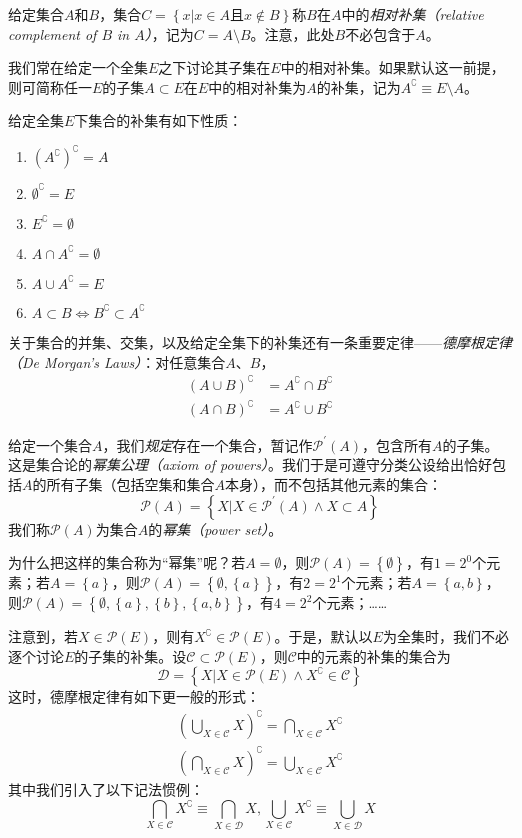 \documentclass[../main.tex]{subfiles}
\begin{document}
给定集合$A$和$B$，集合$C=\left\{x|x\in A\text{且}x\notin B\right\}$称$B$在$A$中的\emph{相对补集（relative complement of $B$ in $A$）}，记为$C=A\setminus B$。注意，此处$B$不必包含于$A$。

我们常在给定一个全集$E$之下讨论其子集在$E$中的相对补集。如果默认这一前提，则可简称任一$E$的子集$A\subset E$在$E$中的相对补集为$A$的补集，记为$A^\complement\equiv E\setminus A$。

给定全集$E$下集合的补集有如下性质：
\begin{enumerate}
\item $\left(A^\complement\right)^\complement=A$
\item $\emptyset^\complement=E$
\item $E^\complement=\emptyset$
\item $A\cap A^\complement=\emptyset$
\item $A\cup A^\complement=E$
\item $A\subset B\Leftrightarrow B^\complement\subset A^\complement$
\end{enumerate}

关于集合的并集、交集，以及给定全集下的补集还有一条重要定律——\emph{德摩根定律（De Morgan's Laws）}：对任意集合$A$、$B$，
\begin{align*}
\left(A\cup B\right)^\complement&=A^\complement\cap B^\complement\\
\left(A\cap B\right)^\complement&=A^\complement\cup B^\complement
\end{align*}

给定一个集合$A$，我们\emph{规定}存在一个集合，暂记作$\mathcal{P}^\prime\left(A\right)$，包含所有$A$的子集。这是集合论的\emph{幂集公理（axiom of powers）}。我们于是可遵守分类公设给出恰好包括$A$的所有子集（包括空集和集合$A$本身），而不包括其他元素的集合：
\[
\mathcal{P}\left(A\right)=\left\{X|X\in\mathcal{P}^\prime\left(A\right)\wedge X\subset A\right\}
\]
我们称$\mathcal{P}\left(A\right)$为集合$A$的\emph{幂集（power set）}。

为什么把这样的集合称为“幂集”呢？若$A=\emptyset$，则$\mathcal{P}\left(A\right)=\left\{\emptyset\right\}$，有$1=2^0$个元素；若$A=\left\{a\right\}$，则$\mathcal{P}\left(A\right)=\left\{\emptyset,\left\{a\right\}\right\}$，有$2=2^1$个元素；若$A=\left\{a,b\right\}$，则$\mathcal{P}\left(A\right)=\left\{\emptyset,\left\{a\right\},\left\{b\right\},\left\{a,b\right\}\right\}$，有$4=2^2$个元素；……

注意到，若$X\in\mathcal{P}\left(E\right)$，则有$X^\complement\in\mathcal{P}\left(E\right)$。于是，默认以$E$为全集时，我们不必逐个讨论$E$的子集的补集。设$\mathcal{C}\subset\mathcal{P}\left(E\right)$，则$\mathcal{C}$中的元素的补集的集合为
\[
\mathcal{D}=\left\{X|X\in\mathcal{P}\left(E\right)\wedge X^\complement\in\mathcal{C}\right\}
\]
这时，德摩根定律有如下更一般的形式：
\begin{align*}
\left(\bigcup_{X\in\mathcal{C}}X\right)^\complement=\bigcap_{X\in\mathcal{C}}X^\complement\\
\left(\bigcap_{X\in\mathcal{C}}X\right)^\complement=\bigcup_{X\in\mathcal{C}}X^\complement
\end{align*}
其中我们引入了以下记法惯例：
\[
\bigcap_{X\in\mathcal{C}}X^\complement\equiv\bigcap_{X\in\mathcal{D}}X, \bigcup_{X\in\mathcal{C}}X^\complement\equiv\bigcup_{X\in\mathcal{D}}X
\]
\end{document}
